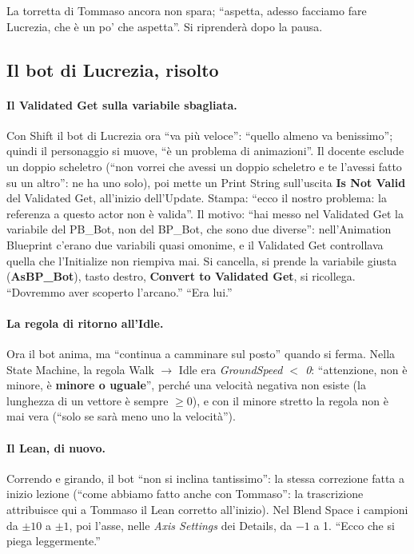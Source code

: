 La torretta di Tommaso ancora non spara; ``aspetta, adesso facciamo fare Lucrezia, che è
un po' che aspetta''. Si riprenderà dopo la pausa.

\subsection{Il bot di Lucrezia, risolto}

\paragraph{Il Validated Get sulla variabile sbagliata.} Con Shift il bot di Lucrezia ora
``va più veloce'': ``quello almeno va benissimo''; quindi il personaggio si muove, ``è un
problema di animazioni''. Il docente esclude un doppio scheletro (``non vorrei che avessi
un doppio scheletro e te l'avessi fatto su un altro'': ne ha uno solo), poi mette un
Print String sull'uscita \textbf{Is Not Valid} del Validated Get, all'inizio dell'Update.
Stampa: ``ecco il nostro problema: la referenza a questo actor non è valida''. Il motivo:
``hai messo nel Validated Get la variabile del PB\_Bot, non del BP\_Bot, che sono due
diverse'': nell'Animation Blueprint c'erano due variabili quasi omonime, e il Validated
Get controllava quella che l'Initialize non riempiva mai. Si cancella, si prende la
variabile giusta (\textbf{AsBP\_Bot}), tasto destro, \textbf{Convert to Validated Get}, si
ricollega. ``Dovremmo aver scoperto l'arcano.'' ``Era lui.''

\paragraph{La regola di ritorno all'Idle.} Ora il bot anima, ma ``continua a camminare sul
posto'' quando si ferma. Nella State Machine, la regola Walk $\rightarrow$ Idle era
\emph{GroundSpeed $<$ 0}: ``attenzione, non è minore, è \textbf{minore o uguale}'',
perché una velocità negativa non esiste (la lunghezza di un vettore è sempre $\ge 0$), e con
il minore stretto la regola non è mai vera (``solo se sarà meno uno la velocità'').

\paragraph{Il Lean, di nuovo.} Correndo e girando, il bot ``non si inclina tantissimo'':
la stessa correzione fatta a inizio lezione (``come abbiamo fatto anche con Tommaso'': la
trascrizione attribuisce qui a Tommaso il Lean corretto all'inizio). Nel Blend Space i
campioni da $\pm 10$ a $\pm 1$, poi l'asse, nelle \emph{Axis Settings} dei Details, da $-1$
a 1. ``Ecco che si piega leggermente.''

